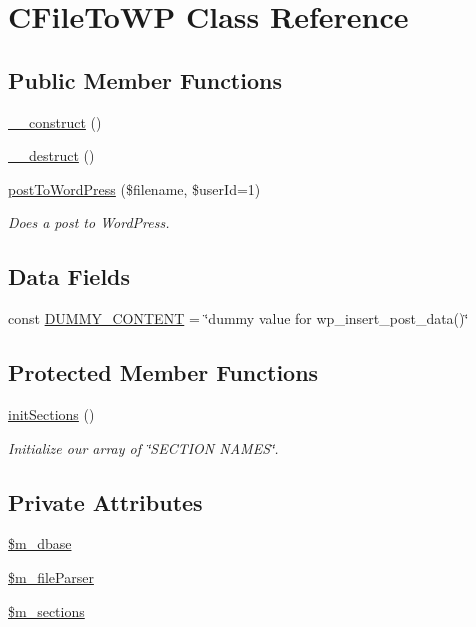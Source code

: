 \hypertarget{class_c_file_to_w_p}{\section{C\+File\+To\+W\+P Class Reference}
\label{class_c_file_to_w_p}
}
\subsection*{Public Member Functions}
\begin{DoxyCompactItemize}
\item 
\hyperlink{class_c_file_to_w_p_a095c5d389db211932136b53f25f39685}{\+\_\+\+\_\+construct} ()
\item 
\hyperlink{class_c_file_to_w_p_a421831a265621325e1fdd19aace0c758}{\+\_\+\+\_\+destruct} ()
\item 
\hyperlink{class_c_file_to_w_p_a4cd3e7afe8337f1a36ad9d858f9b73ab}{post\+To\+Word\+Press} (\$filename, \$user\+Id=1)
\begin{DoxyCompactList}\small\item\em Does a post to Word\+Press. \end{DoxyCompactList}\end{DoxyCompactItemize}
\subsection*{Data Fields}
\begin{DoxyCompactItemize}
\item 
const \hyperlink{class_c_file_to_w_p_a2cbf943c3c9c6f48e6c6595c660a5985}{D\+U\+M\+M\+Y\+\_\+\+C\+O\+N\+T\+E\+N\+T} = \char`\"{}dummy value for wp\+\_\+insert\+\_\+post\+\_\+data()\char`\"{}
\end{DoxyCompactItemize}
\subsection*{Protected Member Functions}
\begin{DoxyCompactItemize}
\item 
\hyperlink{class_c_file_to_w_p_a75e91046c53043e1d94c8e0511a6a2af}{init\+Sections} ()
\begin{DoxyCompactList}\small\item\em Initialize our array of \char`\"{}\+S\+E\+C\+T\+I\+O\+N N\+A\+M\+E\+S\char`\"{}. \end{DoxyCompactList}\end{DoxyCompactItemize}
\subsection*{Private Attributes}
\begin{DoxyCompactItemize}
\item 
\hyperlink{class_c_file_to_w_p_a8e5f38398418ad71cc900f0c20db6bbb}{\$m\+\_\+dbase}
\item 
\hyperlink{class_c_file_to_w_p_a67150998a8e2738b8e5c4e8c160c6aea}{\$m\+\_\+file\+Parser}
\item 
\hyperlink{class_c_file_to_w_p_a24156332f65e1ccec8b6e489b1508d39}{\$m\+\_\+sections}
\end{DoxyCompactItemize}


